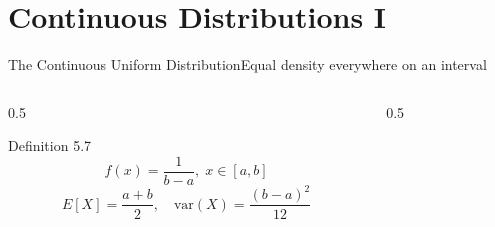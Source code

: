 \documentclass[aspectratio=169,11pt]{beamer}
\begin{document}
\section{Continuous Distributions I}

\begin{frame}{The Continuous Uniform Distribution}{Equal density everywhere on an interval}
  \begin{columns}[T]
    \begin{column}{0.5\textwidth}
      \begin{block}{Definition 5.7}
        \[ f(x) = \frac{1}{b-a}, \; x\in[a,b] \]
        \[ E[X] = \frac{a+b}{2}, \quad \text{var}(X) = \frac{(b-a)^2}{12} \]
      \end{block}
    \end{column}
    \begin{column}{0.5\textwidth}
      \centering
    \end{column}
  \end{columns}
\end{frame}
\end{document}
